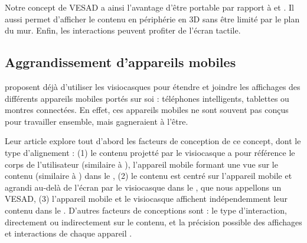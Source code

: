 Notre concept de VESAD a ainsi l'avantage d'être portable par rapport à \cite{Jones2013} et \cite{Benko2015}. Il aussi permet d'afficher le contenu en périphérie en 3D sans être limité par le plan du mur. Enfin, les interactions peuvent profiter de l'écran tactile.



\subsection{Aggrandissement d'appareils mobiles}
\cite{Grubert2015} proposent déjà d'utiliser les visiocasques pour étendre et joindre les affichages des différents appareils mobiles portés sur soi : téléphones intelligents, tablettes ou montres connectées. En effet, ces appareils mobiles ne sont souvent pas conçus pour travailler ensemble, mais gagneraient à l'être. 

Leur article explore tout d'abord les facteurs de conception de ce concept, dont le type d'alignement  : (1) le contenu projetté par le visiocasque a pour référence le corps de l'utilisateur (similaire à \cite{Ens2014}), l'appareil mobile formant une vue  sur le contenu (similaire à \cite{Berge2014}) dans le , (2) le contenu est centré sur l'appareil mobile et agrandi au-delà de l'écran par le visiocasque dans le , que nous appellons un VESAD, (3) l'appareil mobile et le visiocasque affichent indépendemment leur contenu dans le . D'autres facteurs de conceptions sont : le type d'interaction, directement ou indirectement sur le contenu, et la précision possible des affichages et interactions de chaque appareil .


